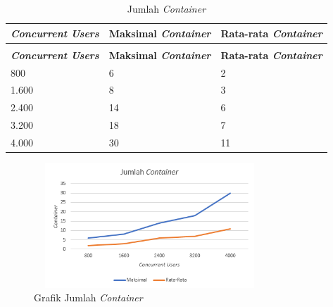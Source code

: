 \begin{longtable}{|p{}|p{}|p{}|}
	\caption{Jumlah \textit{Container}} \label{tjumlahcontainer} \\
	\hline
	\textbf{\textit{Concurrent Users}} & \textbf{Maksimal \textit{Container}} &  \textbf{Rata-rata \textit{Container}} \\ \hline
	\endfirsthead
	\caption[]{Jumlah \textit{Container}} \\
	\hline
	\textbf{\textit{Concurrent Users}} & \textbf{Maksimal \textit{Container}} &  \textbf{Rata-rata \textit{Container}} \\ \hline
	\endhead
	\endfoot
	\endlastfoot
	
	800 & 6 & 2 \\ \hline
	1.600 & 8 & 3 \\ \hline
	2.400 & 14 & 6 \\ \hline
	3.200 & 18 & 7 \\ \hline
	4.000 & 30 & 11 \\ \hline
	
\end{longtable}

\begin{figure}[H]
	\centering
	\includegraphics[width=8.7cm,height=4.7cm]{Images/C-5/jumlahcontainer.png}
	\caption{Grafik Jumlah \textit{Container}}
	\label{gjumlahcontainer}
\end{figure}

